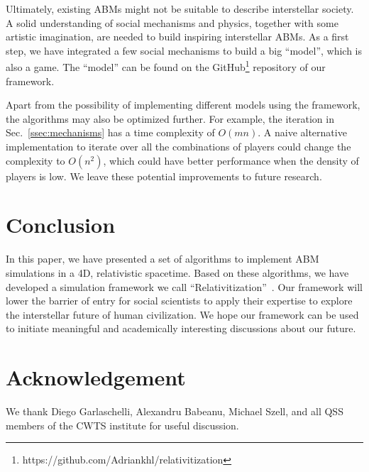 \documentclass{svproc}
\begin{document}
Ultimately, existing ABMs might not be suitable to describe interstellar society.
A solid understanding of social mechanisms and physics,
together with some artistic imagination,
are needed to build inspiring interstellar ABMs.
As a first step,
we have integrated a few social mechanisms to build a big ``model'', which is also a game. 
The ``model'' can be found on the GitHub\footnote{https://github.com/Adriankhl/relativitization} repository of our framework.

Apart from the possibility of implementing different models using the framework, 
the algorithms may also be optimized further.
For example, the iteration in Sec.~\ref{ssec:mechanisms} has a time complexity of $O(mn)$.
A naive alternative implementation to iterate over all the combinations of players could change the complexity to $O(n^2)$,
which could have better performance when the density of players is low.
We leave these potential improvements to future research.

\section{Conclusion}

In this paper, we have presented a set of algorithms to implement ABM simulations in a 4D, relativistic spacetime.
Based on these algorithms, we have developed a simulation framework we call ``Relativitization''~\cite{relativitization}.
Our framework will lower the barrier of entry for social scientists
to apply their expertise to explore the interstellar future of human civilization.
We hope our framework can be used to initiate meaningful and academically interesting discussions
about our future.

\section*{Acknowledgement}
We thank Diego Garlaschelli, Alexandru Babeanu, Michael Szell, and all QSS members of the CWTS institute for useful discussion. 
%
%
\printbibliography
\end{document}
